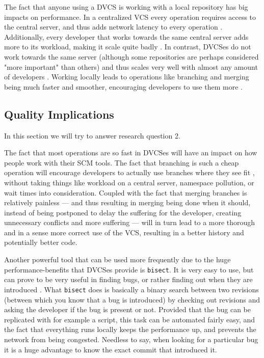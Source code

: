 \documentclass{llncs}
\begin{document}
The fact that anyone using a DVCS is working with a local repository
has big impacts on performance. In a centralized VCS every operation
requires access to the central server, and thus adds network latency
to every operation \cite{torvalds07}. Additionally, every developer
that works towards the same central server adds more to its workload,
making it scale quite badly \cite{mackall06}. In contrast, DVCSes do
not work towards the same server (although some repositories are
perhaps considered "more important" than others) and thus scales very
well with almost any amount of developers \cite{shaikh02}. Working
locally leads to operations like branching and merging being much
faster and smoother, encouraging developers to use them more
\cite{alwis09}.

\subsection{Quality Implications}
In this section we will try to answer research question 2.

The fact that most operations are so fast in DVCSes will have an
impact on how people work with their SCM tools. The fact that
branching is such a cheap operation will encourage developers to
actually use branches where they see fit \cite{alwis09}, without taking
things like workload on a central server, namespace pollution, or wait
times into consideration. Coupled with the fact that merging branches
is relatively painless \cite{alwis09}\cite{osullivan09} --- and thus
resulting in merging being done when it should, instead of being
postponed to delay the suffering for the developer, creating
unnecessary conflicts and more suffering \cite{osullivan09} --- will in
turn lead to a more thorough and in a sense more correct use of the
VCS, resulting in a better history and potentially better code.

Another powerful tool that can be used more frequently due to the huge
performance-benefits that DVCSes provide is \verb!bisect!. It is very
easy to use, but can prove to be very useful in finding bugs, or
rather finding out when they are introduced \cite{osullivan09}. What
\verb!bisect! does is basically a binary search between two revisions
(between which you know that a bug is introduced) by checking out
revisions and asking the developer if the bug is present or
not. Provided that the bug can be replicated with for example a
script, this task can be automated fairly easy, and the fact that
everything runs locally keeps the performance up, and prevents the
network from being congested.  Needless to say, when looking for a
particular bug it is a huge advantage to know the exact commit that
introduced it.
\end{document}
